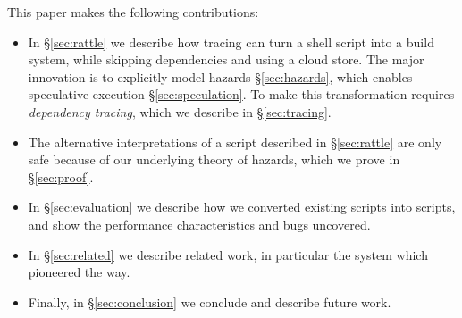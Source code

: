 This paper makes the following contributions:

\begin{itemize}
\item In \S\ref{sec:rattle} we describe how tracing can turn a shell script into a build system, while skipping dependencies and using a cloud store. The major innovation is to explicitly model hazards \S\ref{sec:hazards}, which enables speculative execution \S\ref{sec:speculation}. To make this transformation requires \emph{dependency tracing}, which we describe in \S\ref{sec:tracing}.
\item The alternative interpretations of a script described in \S\ref{sec:rattle} are only safe because of our underlying theory of hazards, which we prove in \S\ref{sec:proof}.
\item In \S\ref{sec:evaluation} we describe how we converted existing \Make scripts into \Rattle scripts, and show the performance characteristics and bugs uncovered.
\item In \S\ref{sec:related} we describe related work, in particular the \Fabricate system which pioneered the way.
\item Finally, in \S\ref{sec:conclusion} we conclude and describe future work.
\end{itemize}
